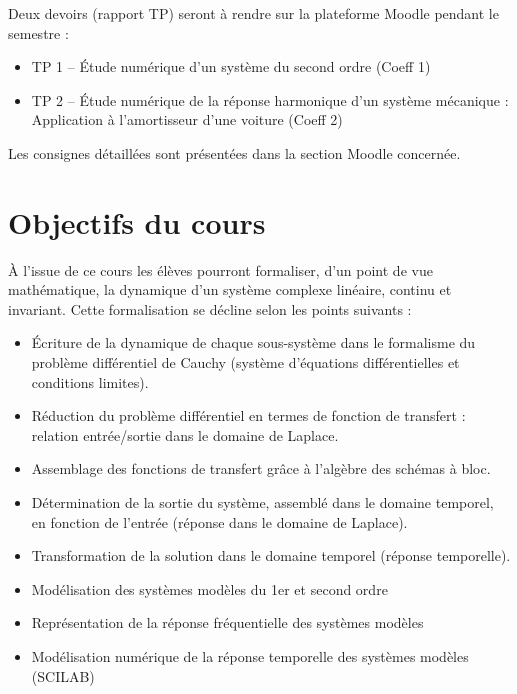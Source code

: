 \documentclass[a4paper,11pt]{article}
\begin{document}
Deux devoirs (rapport TP) seront à rendre sur la plateforme Moodle pendant le semestre :
\begin{itemize}
    \item TP 1 -- \'Etude numérique d'un système du second ordre (Coeff 1)
    \item TP 2 -- \'Etude numérique de la réponse harmonique d'un système mécanique : Application 
        à l'amortisseur d'une voiture (Coeff 2)     
\end{itemize}

Les consignes détaillées sont présentées dans la section Moodle concernée. 

\clearpage
\section*{Objectifs du cours}

À  l'issue  de  ce  cours  les  élèves  pourront  formaliser,  d'un  point  de  vue  mathématique,  
la dynamique d'un système complexe linéaire, continu et invariant. Cette formalisation se décline selon 
les points suivants :  

\begin{itemize}
    \item \'Ecriture  de  la  dynamique  de  chaque  sous-système  dans  le  formalisme  du  
          problème différentiel de Cauchy (système d'équations différentielles et conditions limites).
    \item Réduction du problème différentiel en termes de fonction de transfert : relation entrée/sortie 
          dans le domaine de Laplace.
    \item Assemblage des fonctions de transfert grâce à l'algèbre des schémas à bloc. 
    \item Détermination de la sortie du système, assemblé dans le domaine temporel, en fonction 
          de l'entrée (réponse dans le domaine de Laplace).
    \item Transformation de la solution dans le domaine temporel (réponse temporelle).
    \item Modélisation des systèmes modèles du 1er et second ordre 
    \item Représentation de la réponse fréquentielle des systèmes modèles
    \item Modélisation numérique de la réponse temporelle des systèmes modèles (SCILAB)
\end{itemize}
\end{document}

